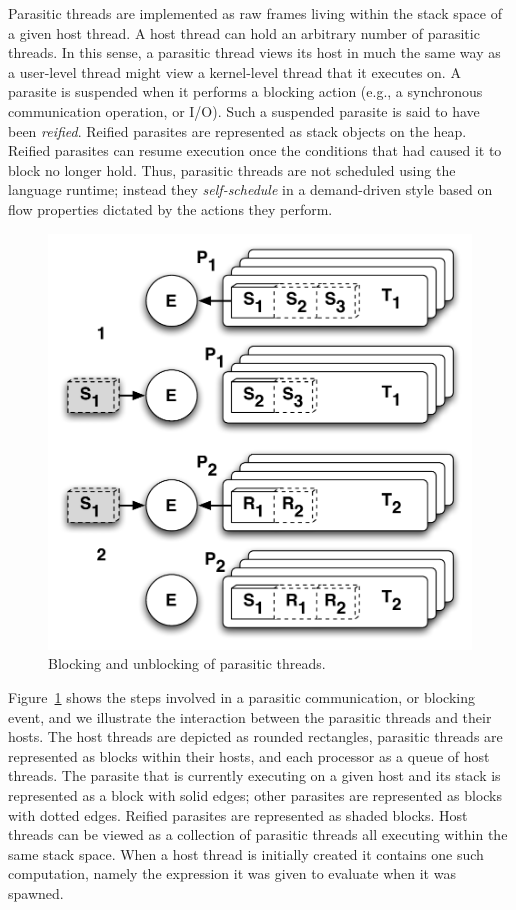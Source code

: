 Parasitic threads are implemented as raw frames living within the stack space
of a given host thread.  A host thread can hold an arbitrary number of
parasitic threads. In this sense, a parasitic thread views its host in much the
same way as a user-level thread might view a kernel-level thread that it
executes on. A parasite is suspended when it performs a blocking action (e.g.,
a synchronous communication operation, or I/O). Such a suspended parasite is
said to have been \emph{reified}. Reified parasites are represented as stack
objects on the heap. Reified parasites can resume execution once the conditions
that had caused it to block no longer hold. Thus, parasitic threads are not
scheduled using the language runtime; instead they \emph{self-schedule} in a
demand-driven style based on flow properties dictated by the actions they
perform.

\begin{figure}[t]
\centering
\includegraphics[scale=0.4]{Figures/communication.pdf}
\caption{Blocking and unblocking of parasitic threads.}
\label{fig:block_unblock}
\end{figure}

Figure~\ref{fig:block_unblock} shows the steps involved in a parasitic
communication, or blocking event, and we illustrate the interaction between the
parasitic threads and their hosts. The host threads are depicted as rounded
rectangles, parasitic threads are represented as blocks within their hosts, and
each processor as a queue of host threads. The parasite that is currently
executing on a given host and its stack is represented as a block with solid
edges; other parasites are represented as blocks with dotted edges. Reified
parasites are represented as shaded blocks. Host threads can be viewed as a
collection of parasitic threads all executing within the same stack space. When
a host thread is initially created it contains one such computation, namely the
expression it was given to evaluate when it was spawned.

